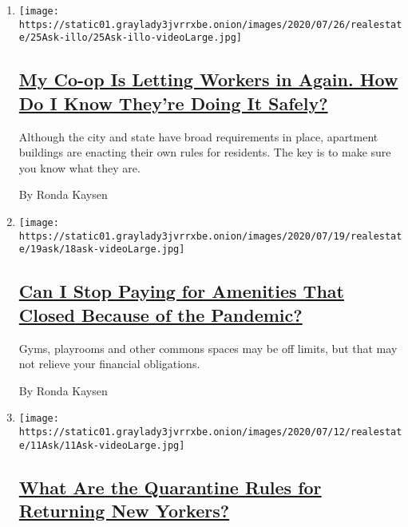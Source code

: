 \begin{enumerate}
\def\labelenumi{\arabic{enumi}.}
\item
  \texttt{[image: https://static01.graylady3jvrrxbe.onion/images/2020/07/26/realestate/25Ask-illo/25Ask-illo-videoLarge.jpg]}

  \hypertarget{my-co-op-is-letting-workers-in-again-how-do-i-know-theyre-doing-it-safely}{%
  \subsection{\texorpdfstring{\href{/2020/07/25/realestate/coronavirus-reopening-workers-in-buildings-rules.html}{My
  Co-op Is Letting Workers in Again. How Do I Know They're Doing It
  Safely?}}{My Co-op Is Letting Workers in Again. How Do I Know They're Doing It Safely?}}\label{my-co-op-is-letting-workers-in-again-how-do-i-know-theyre-doing-it-safely}}

  Although the city and state have broad requirements in place,
  apartment buildings are enacting their own rules for residents. The
  key is to make sure you know what they are.

  By Ronda Kaysen
\item
  \texttt{[image: https://static01.graylady3jvrrxbe.onion/images/2020/07/19/realestate/19ask/18ask-videoLarge.jpg]}

  \hypertarget{can-i-stop-paying-for-amenities-that-closed-because-of-the-pandemic}{%
  \subsection{\texorpdfstring{\href{/2020/07/18/realestate/gym-playroom-fees-coronavirus.html}{Can
  I Stop Paying for Amenities That Closed Because of the
  Pandemic?}}{Can I Stop Paying for Amenities That Closed Because of the Pandemic?}}\label{can-i-stop-paying-for-amenities-that-closed-because-of-the-pandemic}}

  Gyms, playrooms and other commons spaces may be off limits, but that
  may not relieve your financial obligations.

  By Ronda Kaysen
\item
  \texttt{[image: https://static01.graylady3jvrrxbe.onion/images/2020/07/12/realestate/11Ask/11Ask-videoLarge.jpg]}

  \hypertarget{what-are-the-quarantine-rules-for-returning-new-yorkers}{%
  \subsection{\texorpdfstring{\href{/2020/07/11/realestate/what-are-the-quarantine-rules-for-returning-new-yorkers-coronavirus.html}{What
  Are the Quarantine Rules for Returning New
  Yorkers?}}{What Are the Quarantine Rules for Returning New Yorkers?}}\label{what-are-the-quarantine-rules-for-returning-new-yorkers}}


\end{enumerate}
